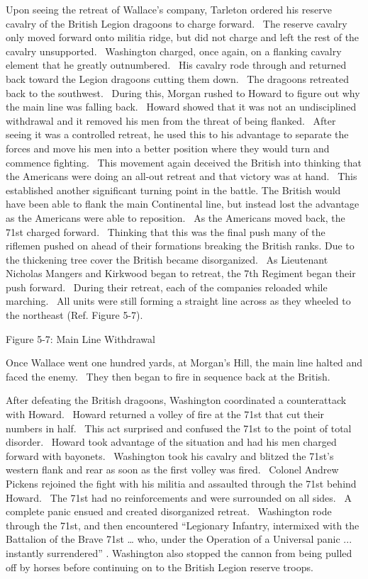 Upon seeing the retreat of Wallace’s company, Tarleton ordered his reserve
cavalry of the British Legion dragoons to charge forward.  The reserve cavalry
only moved forward onto militia ridge, but did not charge and left the rest of
the cavalry unsupported.  Washington charged, once again, on a flanking cavalry
element that he greatly outnumbered.  His cavalry rode through and returned back
toward the Legion dragoons cutting them down.  The dragoons retreated back to
the southwest.  During this, Morgan rushed to Howard to figure out why the main
line was falling back.  Howard showed that it was not an undisciplined
withdrawal and it removed his men from the threat of being flanked.  After
seeing it was a controlled retreat, he used this to his advantage to separate
the forces and move his men into a better position where they would turn and
commence fighting.  This movement again deceived the British into thinking that
the Americans were doing an all-out retreat and that victory was at hand.  This
established another significant turning point in the battle.  The British would
have been able to flank the main Continental line, but instead lost the
advantage as the Americans were able to reposition.  As the Americans moved
back, the 71st charged forward.  Thinking that this was the final push many of
the riflemen pushed on ahead of their formations breaking the British ranks.
Due to the thickening tree cover the British became disorganized.  As Lieutenant
Nicholas Mangers and Kirkwood began to retreat, the 7th Regiment began their
push forward.  During their retreat, each of the companies reloaded while
marching.  All units were still forming a straight line across as they wheeled
to the northeast (Ref. Figure 5-7).



Figure 5-7: Main Line Withdrawal \cite[p.116]{babits_devil_2001}



Once Wallace went one hundred yards, at Morgan’s Hill, the main line halted and
faced the enemy.  They then began to fire in sequence back at the British.  

After defeating the British dragoons, Washington coordinated a counterattack
with Howard.  Howard returned a volley of fire at the 71st that cut their
numbers in half.  This act surprised and confused the 71st to the point of total
disorder.  Howard took advantage of the situation and had his men charged
forward with bayonets.  Washington took his cavalry and blitzed the 71st’s
western flank and rear as soon as the first volley was fired.  Colonel Andrew
Pickens rejoined the fight with his militia and assaulted through the 71st
behind Howard.  The 71st had no reinforcements and were surrounded on all sides.
 A complete panic ensued and created disorganized retreat.  Washington rode
through the 71st, and then encountered “Legionary Infantry, intermixed with the
Battalion of the Brave 71st … who, under the Operation of a Universal panic ...
instantly surrendered” \cite[p.127]{babits_devil_2001}.  Washington also stopped the cannon from
being pulled off by horses before continuing on to the British Legion reserve
troops.    

